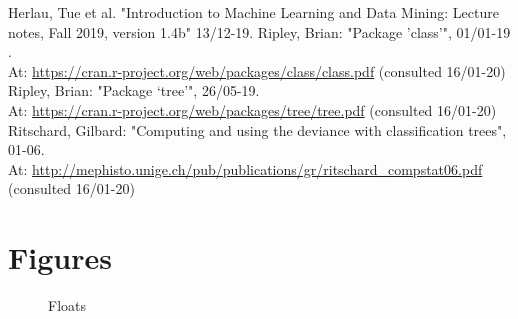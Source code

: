 \documentclass[11pt,fleqn]{article}
\begin{document}
\begin{thebibliography}{9}
	 Herlau, Tue et al. "Introduction to Machine Learning and Data Mining: Lecture notes, Fall 2019, version 1.4b" 13/12-19.
	 Ripley, Brian: "Package ’class’", 01/01-19 .\\
	At:
	\url{https://cran.r-project.org/web/packages/class/class.pdf} (consulted 16/01-20)
	 Ripley, Brian: "Package ‘tree’", 26/05-19.\\ At: \url{https://cran.r-project.org/web/packages/tree/tree.pdf} (consulted 16/01-20)
	 Ritschard, Gilbard: "Computing and using the deviance with classification trees", 01-06.\\
	 At:
	\url{http://mephisto.unige.ch/pub/publications/gr/ritschard_compstat06.pdf} (consulted 16/01-20)
\end{thebibliography}
\appendix
\section{Figures}
\begin{figure}[H]
	
	\centering
	\caption{Floats}
	\label{fig:2dtrajects}
\end{figure}
\end{document}
